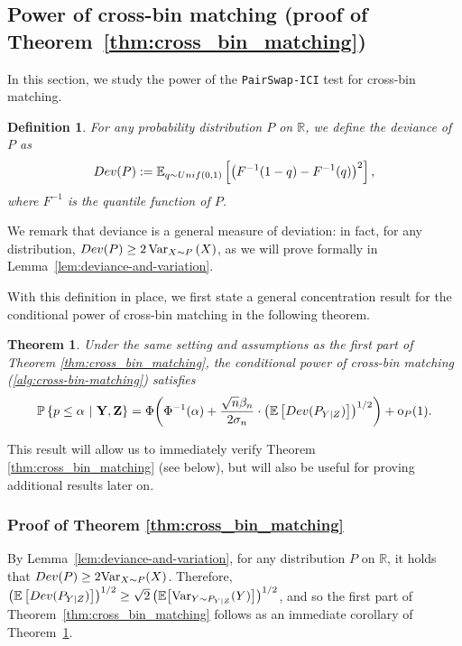 \documentclass[12pt]{article}
\newtheorem{theorem}{Theorem}%
\newtheorem{definition}{Definition}
\newcommand{\R}{\mathbb{R}}
\newcommand{\EE}[1]{\mathbb{E}\left[{#1}\right]}
\newcommand{\VPst}[2]{\mathrm{Var}_{{#1}}({#2})}
\newcommand{\Vp}[2]{\mathrm{Var}_{{#1}}\left({#2}\right)}
\newcommand{\Ep}[2]{\mathbb{E}_{{#1}}\left[{#2}\right]}
\newcommand{\PPst}[2]{\mathbb{P}\left\{{#1}\  \middle| \ {#2}\right\}}
\newcommand{\bY}{\mathbf{Y}}
\newcommand{\bZ}{\mathbf{Z}}
\begin{document}
\subsection{Power of cross-bin matching (proof of Theorem~\ref{thm:cross_bin_matching})}\label{app:power-cross-bin}
In this section, we study the power of the \textnormal{\texttt{PairSwap-ICI}} test for cross-bin matching. 
\begin{definition}
    For any probability distribution $P$ on $\R$, we define the deviance of $P$ as 
    \begin{equation}\label{defn:deviance}
    \textnormal{Dev}(P):=\Ep{q\sim \textnormal{Unif}(0,1)} {\bigl(F^{-1}(1-q)-F^{-1}(q)\bigr)^2},
\end{equation}
where $F^{-1}$ is the quantile function of $P$.
\end{definition}
We remark that deviance is a general measure of deviation: in fact, for any distribution, $\textnormal{Dev}(P)\geq 2\,\Vp{X\sim P}{X}$, as we will prove formally in Lemma~\ref{lem:deviance-and-variation}.

With this definition in place, we first state a general concentration result for the conditional power of cross-bin matching in the following theorem. 

\begin{theorem}\label{thm:cross_bin_matching_general}
     Under the same setting and assumptions as the first part of Theorem \ref{thm:cross_bin_matching}, the conditional power of cross-bin matching (\cref{alg:cross-bin-matching}) satisfies
    \[
   \PPst{p\leq\alpha}{\bY,\bZ}=\Phi\biggl(\Phi^{-1}(\alpha)+\frac{\sqrt{n}\beta_n}{2\sigma_n}\cdot\bigl(\EE{\textnormal{Dev}(P_{Y\mid Z})}\bigr)^{1/2}\biggr)+\mathrm{o}_P(1). 
    \]
\end{theorem}
This result will allow us to immediately verify Theorem \ref{thm:cross_bin_matching} (see below), but will also be useful for proving additional results later on.


\subsubsection{Proof of Theorem \ref{thm:cross_bin_matching}} \label{app:power-cross-bin-mainpaper}
By Lemma~\ref{lem:deviance-and-variation}, for any distribution $P$ on $\R$, it holds that $\textnormal{Dev}(P) \geq 2\VPst{X\sim P}{X}$. Therefore, $\bigl(\EE{\textnormal{Dev}(P_{Y\mid Z})}\bigr)^{1/2}\geq \sqrt{2}\,\bigl(\mathbb{E}\bigl[\VPst{Y\sim P_{Y\mid Z}}{Y}\bigr]\bigr)^{1/2}$, and so the first part of Theorem~\ref{thm:cross_bin_matching} follows as an immediate corollary of Theorem~\ref{thm:cross_bin_matching_general}. 
\end{document}
